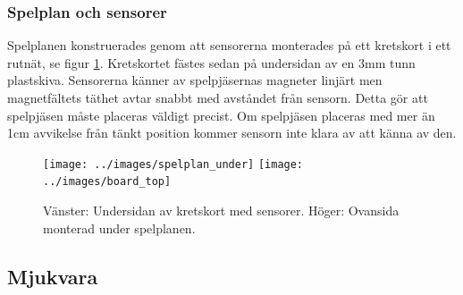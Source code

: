 \documentclass[a4paper]{article}
\begin{document}
\subsubsection*{Spelplan och sensorer}
Spelplanen konstruerades genom att sensorerna monterades på ett kretskort i ett rutnät, se figur \ref{board}.
Kretskortet fästes sedan på undersidan av en 3mm tunn plastskiva.
Sensorerna känner av spelpjäsernas magneter linjärt men magnetfältets täthet avtar snabbt med avståndet från sensorn.
Detta gör att spelpjäsen måste placeras väldigt precist.
Om spelpjäsen placeras med mer än 1cm avvikelse från tänkt position kommer sensorn inte klara av att känna av den.
\begin{figure}\label{board}
\centering
\texttt{[image: ../images/spelplan\_under]}
\texttt{[image: ../images/board\_top]}
\caption{Vänster: Undersidan av kretskort med sensorer. Höger: Ovansida monterad under spelplanen.}
\end{figure}

\subsection{Mjukvara}
\end{document}
